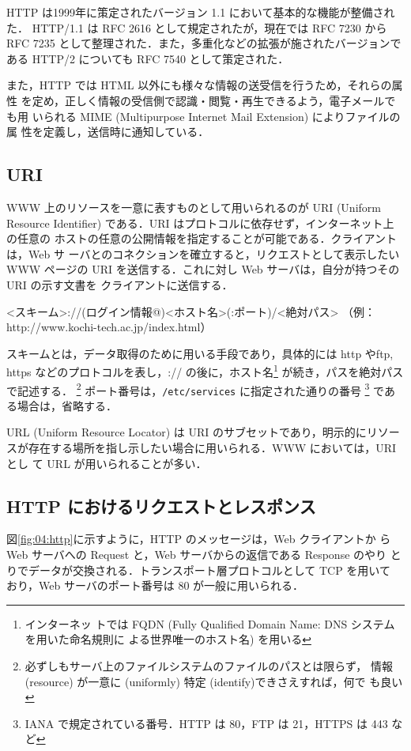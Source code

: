 HTTP は1999年に策定されたバージョン 1.1 において基本的な機能が整備された．
HTTP/1.1 は RFC 2616 として規定されたが，現在では RFC 7230 から RFC 7235 
として整理された．また，多重化などの拡張が施されたバージョンである HTTP/2 
についても RFC 7540 として策定された．

また，HTTP では HTML 以外にも様々な情報の送受信を行うため，それらの属性
を定め，正しく情報の受信側で認識・閲覧・再生できるよう，電子メールでも用
いられる MIME (Multipurpose Internet Mail Extension) によりファイルの属
性を定義し，送信時に通知している．

\subsection{URI}
WWW 上のリソースを一意に表すものとして用いられるのが URI (Uniform Resource 
Identifier) である．URI はプロトコルに依存せず，インターネット上の任意の
ホストの任意の公開情報を指定することが可能である．クライアントは，Web サ
ーバとのコネクションを確立すると，リクエストとして表示したい WWW ページの
 URI を送信する．これに対し Web サーバは，自分が持つその URI の示す文書を
クライアントに送信する．

\begin{cli}
 <スキーム>://(ログイン情報@)<ホスト名>(:ポート)/<絶対パス>
 （例： http://www.kochi-tech.ac.jp/index.html）
\end{cli}

スキームとは，データ取得のために用いる手段であり，具体的には http やftp,
https などのプロトコルを表し，:// の後に，ホスト名\footnote{インターネッ
トでは FQDN (Fully Qualified Domain Name: DNS システムを用いた命名規則に
よる世界唯一のホスト名) を用いる} が続き，パスを絶対パスで記述する．
\footnote{必ずしもサーバ上のファイルシステムのファイルのパスとは限らず，
情報(resource) が一意に (uniformly) 特定 (identify)できさえすれば，何で
も良い} ポート番号は，\texttt{/etc/services} に指定された通りの番号
\footnote{IANA で規定されている番号．HTTP は 80，FTP は 21，HTTPS は 443 
など} である場合は，省略する．

URL (Uniform Resource Locator) は URI のサブセットであり，明示的にリソー
スが存在する場所を指し示したい場合に用いられる．WWW においては，URI とし
て URL が用いられることが多い．

\subsection{HTTP におけるリクエストとレスポンス}

図\ref{fig:04:http}に示すように，HTTP のメッセージは，Web クライアントか
ら Web サーバへの Request と，Web サーバからの返信である Response のやり
とりでデータが交換される．トランスポート層プロトコルとして TCP を用いて
おり，Web サーバのポート番号は 80 が一般に用いられる．

